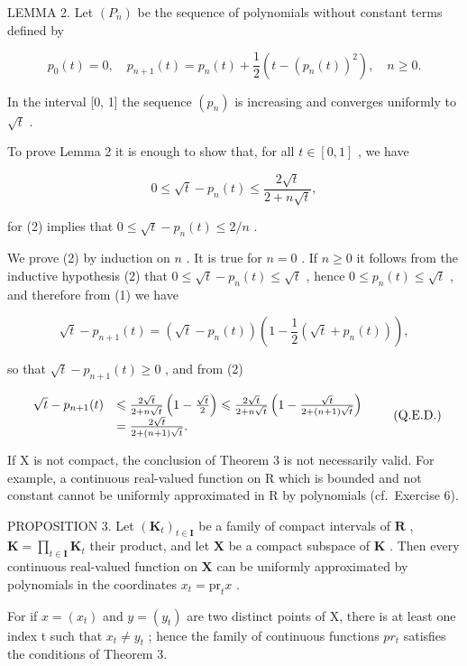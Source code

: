 LEMMA 2. Let \((P_n)\) be the sequence of polynomials without constant terms defined by

\[
p _ {0} (t) = 0, \quad p _ {n + 1} (t) = p _ {n} (t) + \frac {1}{2} (t - (p _ {n} (t)) ^ {2}), \quad n \geqslant 0.\tag{1}
\]

In the interval {[}0, 1{]} the sequence \((p_n)\) is increasing and converges uniformly to \(\sqrt{t}\) .

To prove Lemma 2 it is enough to show that, for all \(t \in [0, 1]\) , we have

\[
0 \leqslant \sqrt {t} - p _ {n} (t) \leqslant \frac {2 \sqrt {t}}{2 + n \sqrt {t}},\tag{2}
\]

for (2) implies that \(0 \leqslant \sqrt{t} - p_n(t) \leqslant 2 / n\) .

We prove (2) by induction on \(n\) . It is true for \(n = 0\) . If \(n \geqslant 0\) it follows from the inductive hypothesis (2) that \(0 \leqslant \sqrt{t} - p_n(t) \leqslant \sqrt{t}\) , hence \(0 \leqslant p_n(t) \leqslant \sqrt{t}\) , and therefore from (1) we have

\[
\sqrt {t} - p _ {n + 1} (t) = (\sqrt {t} - p _ {n} (t)) \left(1 - \frac {1}{2} (\sqrt {t} + p _ {n} (t))\right),
\]

so that \(\sqrt{t} - p_{n+1}(t) \geqslant 0\) , and from (2)

\[
\begin{array}{r l} \sqrt {t} - p _ {n + 1} (t) & \leqslant \frac {2 \sqrt {t}}{2 + n \sqrt {t}} \left(1 - \frac {\sqrt {t}}{2}\right) \leqslant \frac {2 \sqrt {t}}{2 + n \sqrt {t}} \left(1 - \frac {\sqrt {t}}{2 + (n + 1) \sqrt {t}}\right) \\ & = \frac {2 \sqrt {t}}{2 + (n + 1) \sqrt {t}}. \end{array} \tag {Q.E.D.}
\]

If X is not compact, the conclusion of Theorem 3 is not necessarily valid. For example, a continuous real-valued function on R which is bounded and not constant cannot be uniformly approximated in R by polynomials (cf.~Exercise 6).

PROPOSITION 3. Let \((\mathbf{K}_t)_{t \in \mathbf{I}}\) be a family of compact intervals of \(\mathbf{R}\) , \(\mathbf{K} = \prod_{t \in \mathbf{I}} \mathbf{K}_t\) their product, and let \(\mathbf{X}\) be a compact subspace of \(\mathbf{K}\) . Then every continuous real-valued function on \(\mathbf{X}\) can be uniformly approximated by polynomials in the coordinates \(x_t = \mathrm{pr}_t x\) .

For if \(x = (x_{t})\) and \(y = (y_{t})\) are two distinct points of X, there is at least one index t such that \(x_{t} \neq y_{t}\) ; hence the family of continuous functions \(pr_{t}\) satisfies the conditions of Theorem 3.

